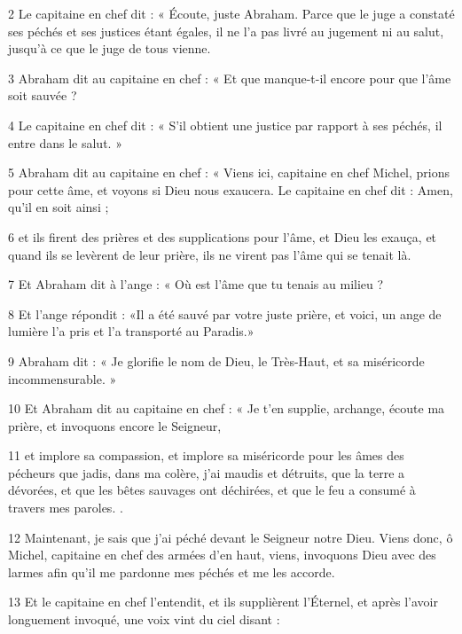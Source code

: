 \par 2 Le capitaine en chef dit : « Écoute, juste Abraham. Parce que le juge a constaté ses péchés et ses justices étant égales, il ne l'a pas livré au jugement ni au salut, jusqu'à ce que le juge de tous vienne.

\par 3 Abraham dit au capitaine en chef : « Et que manque-t-il encore pour que l'âme soit sauvée ?

\par 4 Le capitaine en chef dit : « S'il obtient une justice par rapport à ses péchés, il entre dans le salut. »

\par 5 Abraham dit au capitaine en chef : « Viens ici, capitaine en chef Michel, prions pour cette âme, et voyons si Dieu nous exaucera. Le capitaine en chef dit : Amen, qu'il en soit ainsi ;

\par 6 et ils firent des prières et des supplications pour l'âme, et Dieu les exauça, et quand ils se levèrent de leur prière, ils ne virent pas l'âme qui se tenait là.

\par 7 Et Abraham dit à l'ange : « Où est l'âme que tu tenais au milieu ?

\par 8 Et l'ange répondit : «Il a été sauvé par votre juste prière, et voici, un ange de lumière l'a pris et l'a transporté au Paradis.»

\par 9 Abraham dit : « Je glorifie le nom de Dieu, le Très-Haut, et sa miséricorde incommensurable. »

\par 10 Et Abraham dit au capitaine en chef : « Je t'en supplie, archange, écoute ma prière, et invoquons encore le Seigneur,

\par 11 et implore sa compassion, et implore sa miséricorde pour les âmes des pécheurs que jadis, dans ma colère, j'ai maudis et détruits, que la terre a dévorées, et que les bêtes sauvages ont déchirées, et que le feu a consumé à travers mes paroles. .

\par 12 Maintenant, je sais que j'ai péché devant le Seigneur notre Dieu. Viens donc, ô Michel, capitaine en chef des armées d'en haut, viens, invoquons Dieu avec des larmes afin qu'il me pardonne mes péchés et me les accorde.

\par 13 Et le capitaine en chef l'entendit, et ils supplièrent l'Éternel, et après l'avoir longuement invoqué, une voix vint du ciel disant :

